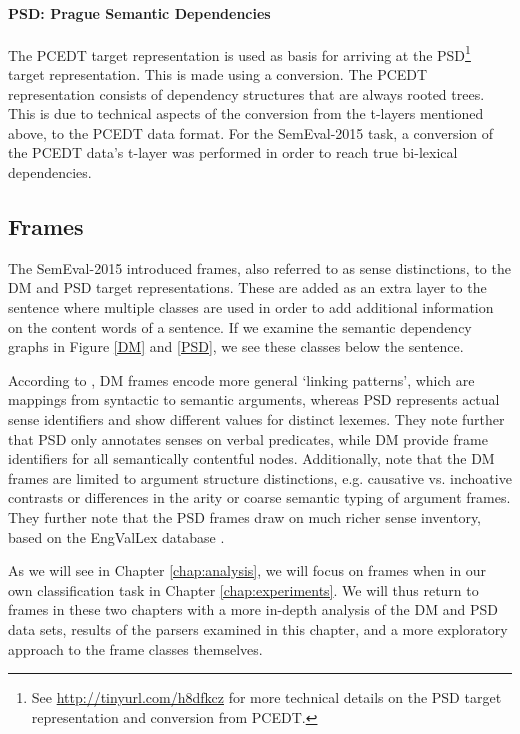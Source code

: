 \paragraph{PSD: Prague Semantic Dependencies} The PCEDT target representation is used as basis for arriving at the PSD\footnote{See \url{http://tinyurl.com/h8dfkcz} for more technical details on the PSD target representation and conversion from PCEDT.} target representation. This is made using a conversion. The PCEDT representation consists of dependency structures that are always rooted trees. This is due to technical aspects of the conversion from the t-layers mentioned above, to the PCEDT data format. For the SemEval-2015 task, a conversion of the PCEDT data's t-layer was performed in order to reach true bi-lexical dependencies.

\subsection{Frames}
\label{sec:frames}

The SemEval-2015 introduced frames, also referred to as sense distinctions, to the DM and PSD target representations. These are added as an extra layer to the sentence where multiple classes are used in order to add additional information on the content words of a sentence. If we examine the semantic dependency graphs in Figure \ref{DM} and \ref{PSD}, we see these classes below the sentence.

According to , DM frames encode more general `linking patterns', which are mappings from syntactic to semantic arguments, whereas PSD represents actual sense identifiers and show different values for distinct lexemes. They note further that PSD only annotates senses on verbal predicates, while DM provide frame identifiers for all semantically contentful nodes. Additionally,  note that the DM frames are limited to argument structure distinctions, e.g. causative vs. inchoative contrasts or differences in the arity or coarse semantic typing of argument frames. They further note that the PSD frames draw on much richer sense inventory, based on the EngValLex database \cite{Cinkova:06}.

As we will see in Chapter \ref{chap:analysis}, we will focus on frames when in our own classification task in Chapter \ref{chap:experiments}. We will thus return to frames in these two chapters with a more in-depth analysis of the DM and PSD data sets, results of the parsers examined in this chapter, and a more exploratory approach to the frame classes themselves.

